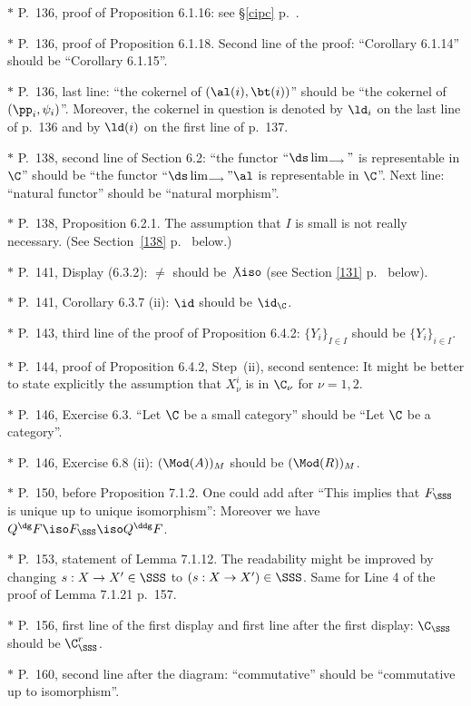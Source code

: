 \documentclass[12pt]{article}
\theoremstyle{remark}
\theoremstyle{definition}
\begin{document}
\nn$*$ P.~136, proof of Proposition 6.1.16: see \S\ref{cipc} p.~.

\nn$*$ P.~136, proof of Proposition 6.1.18. Second line of the proof: ``Corollary 6.1.14'' should be ``Corollary 6.1.15''. 

\nn$*$ P.~136, last line: ``the cokernel of $(\al(i),\bt(i))$'' should be ``the cokernel of $(\pp_i,\psi_i)$''. Moreover, the cokernel in question is denoted by $\ld_i$ on the last line of p.~136 and by $\ld(i)$ on the first line of p.~137.

\nn$*$ P.~138, second line of Section 6.2: ``the functor $``\ds\lim_{\longrightarrow}"$ is representable in $\C$'' should be ``the functor $``\ds\lim_{\longrightarrow}"\al$ is representable in $\C$''. Next line: ``natural functor'' should be ``natural morphism''.

\nn$*$ P.~138, Proposition 6.2.1. The assumption that $I$ is small is not really necessary. (See Section~\ref{138} p.~ below.) 

\nn$*$ P.~141, Display (6.3.2): $\neq$ should be $\not\iso$ (see Section \ref{131} p.~ below). 

\nn$*$ P.~141, Corollary 6.3.7 (ii): $\id$ should be $\id_\C$. 

\nn$*$ P.~143, third line of the proof of Proposition 6.4.2: $\{Y_i\}_{I\in I}$ should be $\{Y_i\}_{i\in I}$.

\nn$*$ P.~144, proof of Proposition 6.4.2, Step~(ii), second sentence: It might be better to state explicitly the assumption that $X_\nu^i$ is in $\C_\nu$ for $\nu=1,2$. 

\nn$*$ P.~146, Exercise 6.3. ``Let $\C$ be a small category'' should be ``Let $\C$ be a category''.

\nn$*$ P.~146, Exercise 6.8 (ii): $(\Mod(A))_M$  should be $(\Mod(R))_M$.

\nn$*$ P.~150, before Proposition 7.1.2. One could add after ``This implies that $F_{\SSS}$ is unique up to unique isomorphism'': Moreover we have $Q^\dg F\iso F_{\SSS}\iso Q^\ddg F$.

\nn$*$ P.~153, statement of Lemma 7.1.12. The readability might be improved by changing $s:X\to X'\in\SSS$ to $(s:X\to X')\in\SSS$. Same for Line 4 of the proof of Lemma 7.1.21 p.~157.

\nn$*$ P.~156, first line of the first display and first line after the first display: $\C_\SSS$ should be $\C_\SSS^r$.

\nn$*$ P.~160, second line after the diagram: ``commutative'' should be ``commutative up to isomorphism''. %
\end{document}
